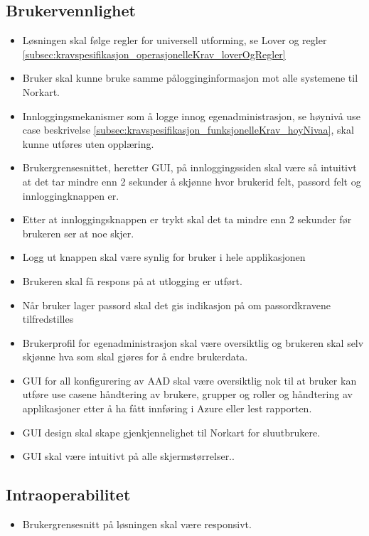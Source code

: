 \subsection{Brukervennlighet}
\label{subsec:kravspesifikasjon_operasjonelleKrav_brukervennlighet}
\begin{itemize}
\item Løsningen skal følge regler for universell utforming, se Lover og regler \ref{subsec:kravspesifikasjon_operasjonelleKrav_loverOgRegler}
\item Bruker skal kunne bruke samme pålogginginformasjon mot alle systemene til Norkart.
\item Innloggingsmekanismer som å logge innog egenadministrasjon, se høynivå use case beskrivelse \ref{subsec:kravspesifikasjon_funksjonelleKrav_hoyNivaa}, skal kunne utføres uten opplæring.
\item Brukergrensesnittet, heretter GUI, på innloggingssiden skal være så intuitivt at det tar mindre enn 2 sekunder å skjønne hvor brukerid felt, passord felt og innloggingknappen er.
\item Etter at innloggingsknappen er trykt skal det ta mindre enn 2 sekunder før brukeren ser at noe skjer.
\item Logg ut knappen skal være synlig for bruker i hele applikasjonen
\item Brukeren skal få respons på at utlogging er utført.
\item Når bruker lager passord skal det gis indikasjon på om passordkravene tilfredstilles
\item Brukerprofil for egenadministrasjon skal være oversiktlig og brukeren skal selv skjønne hva som skal gjøres for å endre brukerdata.
\item GUI for all konfigurering av AAD skal være oversiktlig nok til at bruker kan utføre use casene håndtering av brukere, grupper og roller og håndtering av applikasjoner etter å ha fått innføring i Azure eller lest rapporten.
\item GUI design skal skape gjenkjennelighet til Norkart for sluutbrukere. 
\item GUI skal være intuitivt på alle skjermstørrelser..
\end{itemize}

\subsection{Intraoperabilitet}
\label{subsec:kravspesifikasjon_operasjonelleKrav_intraoperabilitet}
\begin{itemize}
\item Brukergrensesnitt på løsningen skal være responsivt.
\end{itemize}

